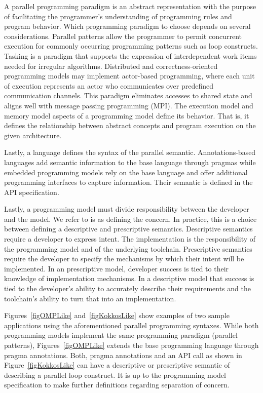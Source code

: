 A parallel programming paradigm is an abstract representation with the purpose of facilitating the programmer's understanding of programming rules and program behavior. Which programming paradigm to choose depends on several considerations. Parallel patterns allow the programmer to permit concurrent execution for commonly occurring programming patterns such as loop constructs. Tasking is a paradigm that supports the expression of interdependent work items needed for irregular algorithms. Distributed and correctness-oriented programming models may implement actor-based programming, where each unit of execution represents an actor who communicates over predefined communication channels. This paradigm eliminates accesses to shared state and aligns well with message passing programming (MPI). The execution model and memory model aspects of a programming model define its behavior. That is, it defines the relationship between abstract concepts and program execution on the given architecture.

Lastly, a language defines the syntax of the parallel semantic. Annotations-based  languages add semantic information to the base language through pragmas while embedded programming models rely on the base language and offer additional programming interfaces to capture information. Their semantic is defined in the API specification. 

Lastly, a programming model must divide responsibility between the developer and the model. We refer to is as defining the concern. In practice, this is a choice between defining a descriptive and prescriptive semantics. Descriptive semantics require a developer to express intent. The implementation is the responsibility of the programming model and of the underlying toolchain. Prescriptive semantics require the developer to specify the mechanisms by which their intent will be implemented. In an prescriptive model, developer success is tied to their knowledge of implementation mechanisms. In a descriptive model that success is tied to the developer's ability to accurately describe their requirements and the toolchain's ability to turn that into an implementation. 

Figures~\ref{figOMPLike} and~\ref{figKokkosLike} show examples of two sample applications using the aforementioned parallel programming syntaxes. While both programming models implement the same programming paradigm (parallel patterns), Figures~\ref{figOMPLike} extends the base programming language through pragma annotations. Both, pragma annotations and an API call as shown in Figure~\ref{figKokkosLike} can have a descriptive or prescriptive semantic of describing a parallel loop construct. It is up to the programming model specification to make further definitions regarding separation of concern.

